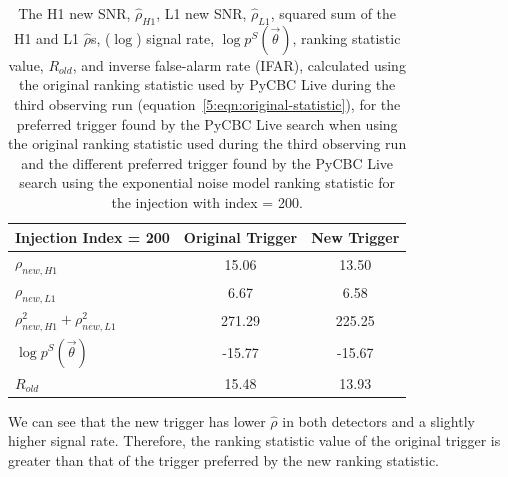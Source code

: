 %
\begin{table}[ht]
    \centering
    \begin{tabular}{lcc}
        \toprule
        \textbf{Injection Index = 200} & \textbf{Original Trigger} & \textbf{New Trigger} \\
        \midrule
        $\rho_{new, H1}$  & 15.06 & 13.50 \\
        $\rho_{new, L1}$   & 6.67 & 6.58 \\
        $\rho_{new, H1}^2 + \rho_{new, L1}^2$   & 271.29 & 225.25 \\
        $\log p^{S}(\Vec{\theta})$ & -15.77 & -15.67 \\
        $R_{old}$ & 15.48 & 13.93 \\
        \bottomrule
    \end{tabular}
    \caption{The H1 new SNR, $\hat{\rho}_{H1}$, L1 new SNR, $\hat{\rho}_{L1}$, squared sum of the H1 and L1 $\hat{\rho}$s, ($\log$) signal rate, $\log p^{S}(\Vec{\theta})$, ranking statistic value, $R_{old}$, and inverse false-alarm rate (IFAR), calculated using the original ranking statistic used by PyCBC Live during the third observing run (equation~\ref{5:eqn:original-statistic}), for the preferred trigger found by the PyCBC Live search when using the original ranking statistic used during the third observing run and the different preferred trigger found by the PyCBC Live search using the exponential noise model ranking statistic for the injection with index = 200.}
    \label{5:tab:200-old-stat}
\end{table}
%
We can see that the new trigger has lower $\hat{\rho}$ in both detectors and a slightly higher signal rate. Therefore, the ranking statistic value of the original trigger is greater than that of the trigger preferred by the new ranking statistic.

